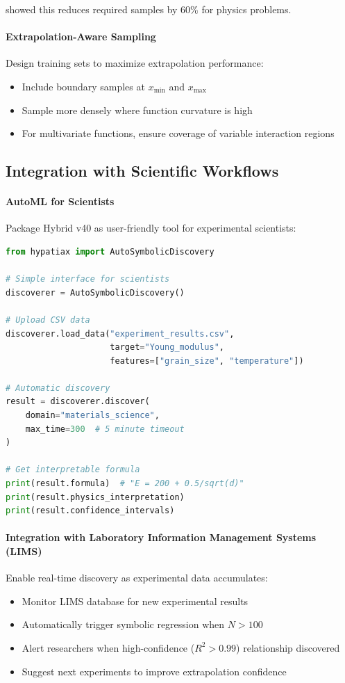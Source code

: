 \citet{udrescu2020ai} showed this reduces required samples by 60\% for physics problems.

\paragraph{Extrapolation-Aware Sampling}
Design training sets to maximize extrapolation performance:
\begin{itemize}
    \item Include boundary samples at $x_{\min}$ and $x_{\max}$
    \item Sample more densely where function curvature is high
    \item For multivariate functions, ensure coverage of variable interaction regions
\end{itemize}

\subsection{Integration with Scientific Workflows}

\paragraph{AutoML for Scientists}
Package Hybrid v40 as user-friendly tool for experimental scientists:

\begin{lstlisting}[language=Python, caption=Proposed User Interface]
from hypatiax import AutoSymbolicDiscovery

# Simple interface for scientists
discoverer = AutoSymbolicDiscovery()

# Upload CSV data
discoverer.load_data("experiment_results.csv",
                     target="Young_modulus",
                     features=["grain_size", "temperature"])

# Automatic discovery
result = discoverer.discover(
    domain="materials_science",
    max_time=300  # 5 minute timeout
)

# Get interpretable formula
print(result.formula)  # "E = 200 + 0.5/sqrt(d)"
print(result.physics_interpretation)
print(result.confidence_intervals)
\end{lstlisting}

\paragraph{Integration with Laboratory Information Management Systems (LIMS)}
Enable real-time discovery as experimental data accumulates:
\begin{itemize}
    \item Monitor LIMS database for new experimental results
    \item Automatically trigger symbolic regression when $N > 100$
    \item Alert researchers when high-confidence ($R^2 > 0.99$) relationship discovered
    \item Suggest next experiments to improve extrapolation confidence
\end{itemize}

